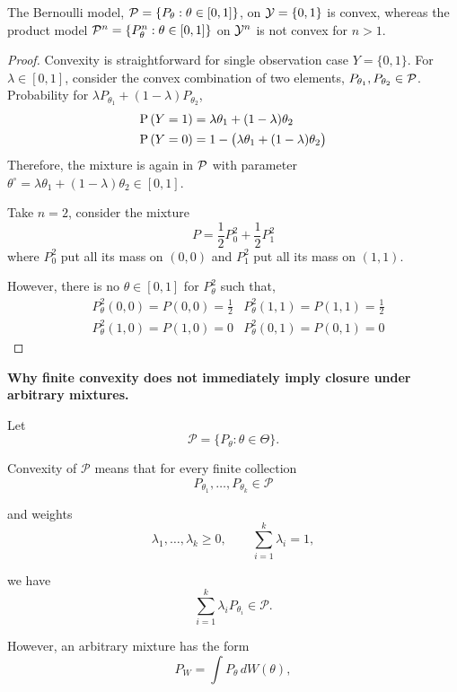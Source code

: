 \begin{remark}

The Bernoulli model, $\mathcal{P}=\{P_\theta:\theta\in[0,1]\}$, on $\mathcal{Y}=\{0,1\}$ is convex, 
whereas the product model $\mathcal{P}^n=\{P_\theta^n:\theta\in[0,1]\}$ on $\mathcal{Y}^n$ is not convex for $n>1$.

\end{remark}

\begin{proof}
	Convexity is straightforward for single observation case $Y=\{0,1\}$.
	For $\lambda\in [0,1]$, consider the convex combination of two elements,
	$P_{\theta_1},P_{\theta_2}\in \mathcal{P}$.
	Probability for $\lambda P_{\theta_1}+(1-\lambda)P_{\theta_2}$,
	\begin{align*}
		\PR{Y=1} &= \lambda \theta_1+(1-\lambda)\theta_2 \\
		\PR{Y=0} &= 1-\bigl(\lambda \theta_1+(1-\lambda)\theta_2\bigr)
	\end{align*}
	Therefore, the mixture is again in $\mathcal{P}$ with parameter $\theta^\circ=\lambda \theta_1+(1-\lambda)\theta_2\in[0,1]$.
	
	Take $n=2$, consider the mixture
	\begin{equation}
		P = \frac{1}{2} P_0^2 + \frac{1}{2} P_1^2
	\end{equation}
	where $P_0^2$ put all its mass on $(0,0)$ and $P_1^2$ put all its mass on $(1,1)$.
	
	However, there is no $\theta\in[0,1]$ for $P_\theta^2$ such that,
	\begin{align*}
		&P_\theta^2(0,0) = P(0,0) = \frac{1}{2} 
		&P_\theta^2(1,1) = P(1,1) = \frac{1}{2} \\
		&P_\theta^2(1,0) = P(1,0) = 0
		&P_\theta^2(0,1) = P(0,1) = 0
	\end{align*}
\end{proof}


\textbf{Why finite convexity does not immediately imply closure under arbitrary mixtures.}

Let
$$
\mathcal P=\{P_\theta:\theta\in\Theta\}.
$$

Convexity of $\mathcal P$ means that for every finite collection
$$
P_{\theta_1},\dots,P_{\theta_k}\in\mathcal P
$$

and weights
$$
\lambda_1,\dots,\lambda_k\ge 0,
\qquad
\sum_{i=1}^k \lambda_i=1,
$$

we have
$$
\sum_{i=1}^k \lambda_i P_{\theta_i}\in\mathcal P.
$$

However, an arbitrary mixture has the form
$$
P_W=\int P_\theta\,dW(\theta),
$$

